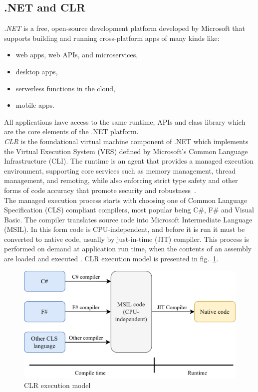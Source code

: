 \subsection{.NET and CLR}
\emph{.NET} is a free, open-source development platform developed by Microsoft that supports building and running cross-platform apps of many kinds like:
\begin{itemize}
	\item web apps, web APIs, and microservices,
	\item desktop apps,
	\item serverless functions in the cloud,
	\item mobile apps.
\end{itemize}

All applications have access to the same runtime, APIs and class library which are the core elements of the .NET platform.\\

\emph{CLR} is the foundational virtual machine component of .NET which implements the Virtual Execution System (VES) defined by Microsoft's Common Language Infrastructure (CLI). The runtime is an agent that provides a managed execution environment, supporting core services such as memory management, thread management, and remoting, while also enforcing strict type safety and other forms of code accuracy that promote security and robustness~\cite{IntroductionToNet}.\\

The managed execution process starts with choosing one of Common Language Specification (CLS) compliant compilers, most popular being C\#, F\# and Visual Basic. The compiler translates source code into Microsoft Intermediate Language (MSIL). In this form code is CPU-independent, and before it is run it must be converted to native code, usually by just-in-time (JIT) compiler. This process is performed on demand at application run time, when the contents of an assembly are loaded and executed \cite{ManagedExecution}.
CLR execution model is presented in fig.~\ref{fig:clr}.

\begin{figure}[htb]
	\centering
		\includegraphics[scale=1.0]{figures02/clr.png}
	\caption{CLR execution model}
	\label{fig:clr}
\end{figure}


